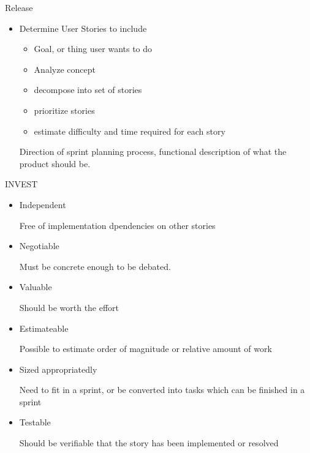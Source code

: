 \documentclass{report}
\begin{document}
Release
\begin{mdframed}
    \begin{itemize}
        \item Determine User Stories to include
            \begin{itemize}
                \item Goal, or thing user wants to do
                \item Analyze concept
                \item decompose into set of stories
                \item prioritize stories
                \item estimate difficulty and time required for each story
                
            \end{itemize}

            Direction of sprint planning process, functional description of
            what the product should be.
    \end{itemize}
    INVEST
    \begin{itemize}
        \item Independent

            Free of implementation dpendencies on other stories
        \item Negotiable

            Must be concrete enough to be debated.

        \item Valuable

            Should be worth the effort

        \item Estimateable

            Possible to estimate order of magnitude or relative
            amount of work

        \item Sized appropriatedly

            Need to fit in a sprint, or be converted into
            tasks which can be finished in a sprint

        \item Testable

            Should be verifiable that the story has been implemented or
            resolved
    \end{itemize}

\end{mdframed}
\end{document}
